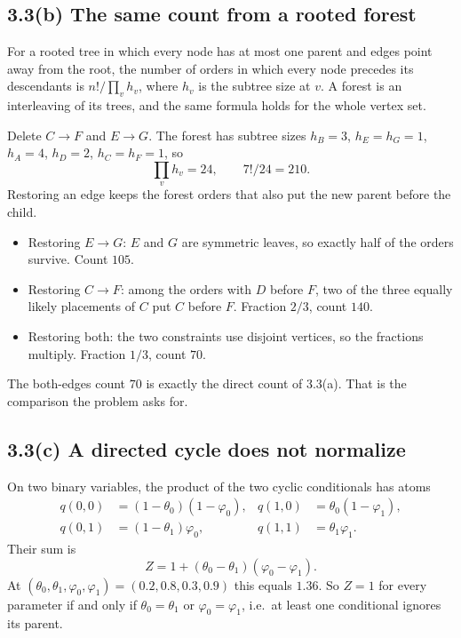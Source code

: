 \documentclass[11pt]{article}
\theoremstyle{remark}
\begin{document}
\subsection*{3.3(b) The same count from a rooted forest}

For a rooted tree in which every node has at most one parent and edges point away from the root, the number of orders in which every node precedes its descendants is \(n!/\prod_v h_v\), where \(h_v\) is the subtree size at \(v\). A forest is an interleaving of its trees, and the same formula holds for the whole vertex set.

Delete \(C\to F\) and \(E\to G\). The forest has subtree sizes \(h_B=3\), \(h_E=h_G=1\), \(h_A=4\), \(h_D=2\), \(h_C=h_F=1\), so
\[
\prod_v h_v=24,\qquad 7!/24=210.
\]
Restoring an edge keeps the forest orders that also put the new parent before the child.
\begin{itemize}
\item Restoring \(E\to G\): \(E\) and \(G\) are symmetric leaves, so exactly half of the orders survive. Count \(105\).
\item Restoring \(C\to F\): among the orders with \(D\) before \(F\), two of the three equally likely placements of \(C\) put \(C\) before \(F\). Fraction \(2/3\), count \(140\).
\item Restoring both: the two constraints use disjoint vertices, so the fractions multiply. Fraction \(1/3\), count \(70\).
\end{itemize}
The both-edges count \(70\) is exactly the direct count of 3.3(a). That is the comparison the problem asks for.

\subsection*{3.3(c) A directed cycle does not normalize}

On two binary variables, the product of the two cyclic conditionals has atoms
\begin{align*}
q(0,0)&=(1-\theta_0)(1-\varphi_0),&
q(1,0)&=\theta_0(1-\varphi_1),\\
q(0,1)&=(1-\theta_1)\varphi_0,&
q(1,1)&=\theta_1\varphi_1.
\end{align*}
Their sum is
\[
Z=1+(\theta_0-\theta_1)(\varphi_0-\varphi_1).
\]
At \((\theta_0,\theta_1,\varphi_0,\varphi_1)=(0.2,0.8,0.3,0.9)\) this equals \(1.36\). So \(Z=1\) for every parameter if and only if \(\theta_0=\theta_1\) or \(\varphi_0=\varphi_1\), i.e.\ at least one conditional ignores its parent.
\end{document}

